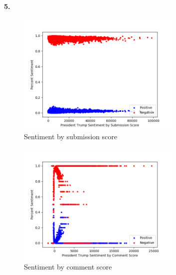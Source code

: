 \documentclass{article}
\begin{document}
\textbf{5.}
\begin{figure}[H]
\centering
\includegraphics[width=0.7\textwidth]{5.png}
\caption{Sentiment by submission score}\label{7}
\end{figure}
\begin{figure}[H]
\centering
\includegraphics[width=0.7\textwidth]{6.png}
\caption{Sentiment by comment score}\label{8}
\end{figure}
\end{document}
